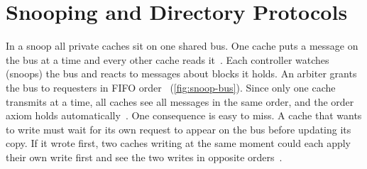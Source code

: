 \section{Snooping and Directory Protocols}
\label{sec:coh-snoop}
\label{sec:coh-dir}
%

In a \gls{snoop} all private caches sit on one shared bus.
One cache puts a message on the bus at a time and every other cache reads
it~\cite[\S12.4.6]{sarangi2025basic}. Each controller watches (snoops) the bus and
reacts to messages about blocks it holds. An arbiter grants the bus to requesters
in FIFO order~\cite[\S13.4.3]{sarangi2025basic} (\cref{fig:snoop-bus}). Since only
one cache transmits at a time, all caches see all messages in the same order, and
the order axiom holds automatically~\cite[\S12.4.6]{sarangi2025basic}. One
consequence is easy to miss. A cache that wants to write must wait for its own
request to appear on the bus before updating its copy. If it wrote first, two
caches writing at the same moment could each apply their own write first and see
the two writes in opposite orders~\cite[\S12.4.6, Question~8]{sarangi2025basic}.


